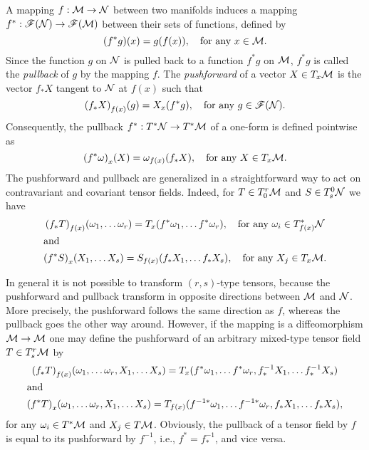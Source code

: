 \documentclass[
final,
11pt,
a4paper,
DIV=11,
headinclude=true,
footinclude=false,
bibliography=totoc,
twoside=true,  %
BCOR=5mm
]{scrbook}
\begin{document}
A mapping $f : \mathcal{M} \to \mathcal{N}$ between two manifolds induces a 
mapping $f^*: \mathscr{F}(\mathcal{N}) \to \mathscr{F}(\mathcal{M})$ 
between their sets of functions, defined by
\begin{equation*}
  (f^* g)(x) = g(f(x)),\quad\text{for any}~x\in\mathcal{M}.
\end{equation*}
Since the function $g$ on $\mathcal{N}$ is pulled back to a function 
$f^* g$ on $\mathcal{M}$, $f^*g$ is called the \emph{pullback} of $g$ 
by the mapping $f$. The \emph{pushforward} of a vector $X \in T_x 
\mathcal{M}$ is the vector $f_*X$ tangent to $\mathcal{N}$ at $f(x)$ such 
that
\begin{equation*}
  {(f_*X)}_{f(x)}(g) = X_x(f^*g),
  \quad\text{for any}~g \in \mathscr{F}(\mathcal{N}).
\end{equation*}
Consequently, the pullback $f^* : T^*\mathcal{N} \to T^*\mathcal{M}$ of a 
one-form is defined pointwise as
\begin{equation*}
  {(f^*\omega)}_x(X) = \omega_{f(x)}(f_*X),
  \quad\text{for any}~X\in T_x\mathcal{M}.
\end{equation*}
The pushforward and pullback are generalized in a straightforward 
way to act on contravariant and covariant tensor fields. Indeed, 
for $T \in T^r_0\mathcal{M}$ and $S \in T^0_s\mathcal{N}$ we have
\begin{gather*}
  {(f_*T)}_{f(x)}(\omega_1,\dots \omega_r)
    = T_x(f^*\omega_1,\dots f^*\omega_r),
  \quad\text{for any}~\omega_i \in T^*_{f(x)}\mathcal{N}
  \\
  \shortintertext{and}
  {(f^*S)}_x(X_1,\dots X_s)
    = S_{f(x)}(f_*X_1,\dots f_*X_s),
  \quad\text{for any}~X_j \in T_x\mathcal{M}.
\end{gather*}

In general it is not possible to transform $(r,s)$-type tensors, 
because the pushforward and pullback transform in opposite 
directions between $\mathcal{M}$ and $\mathcal{N}$. More precisely, the 
pushforward follows the same direction as $f$, whereas the 
pullback goes the other way around. However, if the mapping is a 
diffeomorphism $\mathcal{M} \to \mathcal{M}$ one may define the pushforward 
of an arbitrary mixed-type tensor field $T \in
T^r_s\mathcal{M}$ by
\begin{gather*}
  {(f_* T)}_{f(x)}(\omega_1,\dots \omega_r,X_1,\dots X_s)
    = T_x(f^*\omega_1,\dots f^*\omega_r,f^{-1}_*X_1,\dots 
    f^{-1}_*X_s)
  \\
  \shortintertext{and}
  {(f^* T)}_x(\omega_1,\dots \omega_r,X_1,\dots X_s)
    = T_{f(x)}(f^{-1*}\omega_1,\dots f^{-1*}\omega_r,f_*X_1,\dots 
    f_*X_s),
\end{gather*}
for any $\omega_i \in T^*\mathcal{M}$ and $X_j \in T\mathcal{M}$.  
Obviously, the pullback of a tensor field by $f$ is equal to its 
pushforward by $f^{-1}$, i.e., $f^* = f^{-1}_*$, and vice versa.
\end{document}

